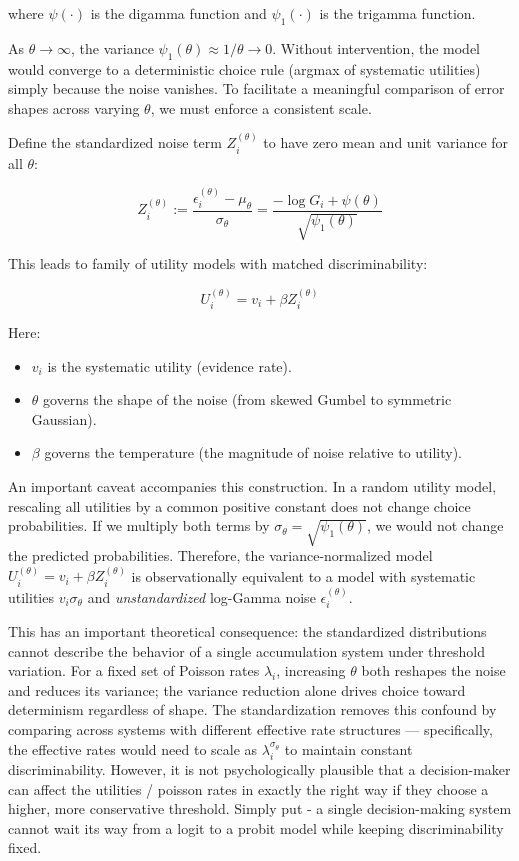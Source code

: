 \documentclass[
  man,
  floatsintext,
  longtable,
  a4paper,
  nolmodern,
  notxfonts,
  notimes,
  colorlinks=true,linkcolor=blue,citecolor=blue,urlcolor=blue]{apa7}
\providecommand{\tightlist}{%
  \setlength{\itemsep}{0pt}\setlength{\parskip}{0pt}}
\begin{document}
where \(\psi(\cdot)\) is the digamma function and \(\psi_1(\cdot)\) is
the trigamma function.

As \(\theta \to \infty\), the variance
\(\psi_1(\theta) \approx 1/\theta \to 0\). Without intervention, the
model would converge to a deterministic choice rule (argmax of
systematic utilities) simply because the noise vanishes. To facilitate a
meaningful comparison of error shapes across varying \(\theta\), we must
enforce a consistent scale.

Define the standardized noise term \(Z_i^{(\theta)}\) to have zero mean
and unit variance for all \(\theta\):

\[
Z_i^{(\theta)} := \frac{\epsilon_i^{(\theta)} - \mu_\theta}{\sigma_\theta} = \frac{-\log G_i + \psi(\theta)}{\sqrt{\psi_1(\theta)}}
\]

This leads to family of utility models with matched discriminability:

\[
U_i^{(\theta)} = v_i + \beta Z_i^{(\theta)}
\]

Here:

\begin{itemize}
\tightlist
\item
  \(v_i\) is the systematic utility (evidence rate).
\item
  \(\theta\) governs the shape of the noise (from skewed Gumbel to
  symmetric Gaussian).
\item
  \(\beta\) governs the temperature (the magnitude of noise relative to
  utility).
\end{itemize}

An important caveat accompanies this construction. In a random utility
model, rescaling all utilities by a common positive constant does not
change choice probabilities. If we multiply both terms by
\(\sigma_\theta = \sqrt{\psi_1(\theta)}\), we would not change the
predicted probabilities. Therefore, the variance-normalized model
\(U_i^{(\theta)} = v_i + \beta Z_i^{(\theta)}\) is observationally
equivalent to a model with systematic utilities \(v_i \sigma_\theta\)
and \emph{unstandardized} log-Gamma noise \(\epsilon_i^{(\theta)}\).

This has an important theoretical consequence: the standardized
distributions cannot describe the behavior of a single accumulation
system under threshold variation. For a fixed set of Poisson rates
\(\lambda_i\), increasing \(\theta\) both reshapes the noise and reduces
its variance; the variance reduction alone drives choice toward
determinism regardless of shape. The standardization removes this
confound by comparing across systems with different effective rate
structures --- specifically, the effective rates would need to scale as
\(\lambda_i^{\sigma_\theta}\) to maintain constant discriminability.
However, it is not psychologically plausible that a decision-maker can
affect the utilities / poisson rates in exactly the right way if they
choose a higher, more conservative threshold. Simply put - a single
decision-making system cannot wait its way from a logit to a probit
model while keeping discriminability fixed.
\end{document}
